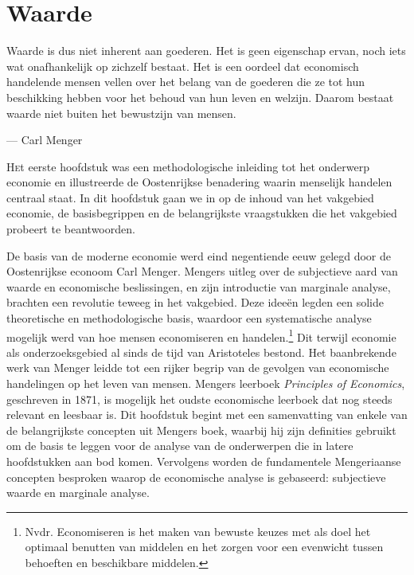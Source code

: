 \chapter{Waarde}

\begin{blockquotebox}
    Waarde is dus niet inherent aan goederen. Het is geen eigenschap ervan, noch iets wat onafhankelijk op zichzelf bestaat. Het is een oordeel dat economisch handelende mensen vellen over het belang van de goederen die ze tot hun beschikking hebben voor het behoud van hun leven en welzijn. Daarom bestaat waarde niet buiten het bewustzijn van mensen.\footnotemark
    \par\raggedleft--- Carl Menger
\end{blockquotebox}

\lettrine{H}et eerste hoofdstuk was een methodologische inleiding tot het onderwerp economie en illustreerde de Oostenrijkse benadering waarin menselijk handelen centraal staat. In dit hoofdstuk gaan we in op de inhoud van het vakgebied economie, de basisbegrippen en de belangrijkste vraagstukken die het vakgebied probeert te beantwoorden.

De basis van de moderne economie werd eind negentiende eeuw gelegd door de Oostenrijkse econoom Carl Menger. Mengers uitleg over de subjectieve aard van waarde en economische beslissingen, en zijn introductie van marginale analyse, brachten een revolutie teweeg in het vakgebied. Deze ideeën legden een solide theoretische en methodologische basis, waardoor een systematische analyse mogelijk werd van hoe mensen economiseren en handelen.\footnote{Nvdr. Economiseren is het maken van bewuste keuzes met als doel het optimaal benutten van middelen en het zorgen voor een evenwicht tussen behoeften en beschikbare middelen.} Dit terwijl economie als onderzoeksgebied al sinds de tijd van Aristoteles bestond. Het baanbrekende werk van Menger leidde tot een rijker begrip van de gevolgen van economische handelingen op het leven van mensen. Mengers leerboek \textit{Principles of Economics}, geschreven in 1871, is mogelijk het oudste economische leerboek dat nog steeds relevant en leesbaar is. Dit hoofdstuk begint met een samenvatting van enkele van de belangrijkste concepten uit Mengers boek, waarbij hij zijn definities gebruikt om de basis te leggen voor de analyse van de onderwerpen die in latere hoofdstukken aan bod komen. Vervolgens worden de fundamentele Mengeriaanse concepten besproken waarop de economische analyse is gebaseerd: subjectieve waarde en marginale analyse.

